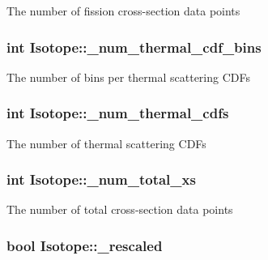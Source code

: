 The number of fission cross-\/section data points \hypertarget{classIsotope_afebdcf957b234c7118d9717c5a91a501}{
\subsubsection[{\-\_\-num\-\_\-thermal\-\_\-cdf\-\_\-bins}]{\setlength{\rightskip}{0pt plus 5cm}int Isotope\-::\-\_\-num\-\_\-thermal\-\_\-cdf\-\_\-bins\hspace{0.3cm}{\ttfamily [private]}}}\label{classIsotope_afebdcf957b234c7118d9717c5a91a501}
The number of bins per thermal scattering C\-D\-Fs \hypertarget{classIsotope_abf995cc9b729abb1000a2b487e935910}{
\subsubsection[{\-\_\-num\-\_\-thermal\-\_\-cdfs}]{\setlength{\rightskip}{0pt plus 5cm}int Isotope\-::\-\_\-num\-\_\-thermal\-\_\-cdfs\hspace{0.3cm}{\ttfamily [private]}}}\label{classIsotope_abf995cc9b729abb1000a2b487e935910}
The number of thermal scattering C\-D\-Fs \hypertarget{classIsotope_a2e143d4521991dc55cbef4e6c5f02796}{
\subsubsection[{\-\_\-num\-\_\-total\-\_\-xs}]{\setlength{\rightskip}{0pt plus 5cm}int Isotope\-::\-\_\-num\-\_\-total\-\_\-xs\hspace{0.3cm}{\ttfamily [private]}}}\label{classIsotope_a2e143d4521991dc55cbef4e6c5f02796}
The number of total cross-\/section data points \hypertarget{classIsotope_a566f4289e1a7eaad70c02b63113040e5}{
\subsubsection[{\-\_\-rescaled}]{\setlength{\rightskip}{0pt plus 5cm}bool Isotope\-::\-\_\-rescaled\hspace{0.3cm}{\ttfamily [private]}}}\label{classIsotope_a566f4289e1a7eaad70c02b63113040e5}

